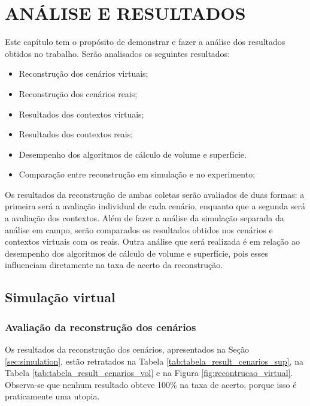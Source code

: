 
\chapter{ANÁLISE E RESULTADOS}
\label{chap:resultados}

Este capítulo tem o propósito de demonstrar e fazer a análise dos resultados obtidos no trabalho.
Serão analisados os seguintes resultados:

\begin{itemize}
    \vspace{0.5em}
    \item Reconstrução dos cenários virtuais;
    \item Reconstrução dos cenários reais;
    \item Resultados dos contextos virtuais;
    \item Resultados dos contextos reais;
    \item Desempenho dos algoritmos de cálculo de volume e superfície.
    \item Comparação entre reconstrução em simulação e no experimento;
\end{itemize}
\vspace{1em}

Os resultados da reconstrução de ambas coletas serão avaliados de duas formas: a primeira será a avaliação individual de cada cenário, enquanto que a segunda será a avaliação dos contextos.
Além de fazer a análise da simulação separada da análise em campo, serão comparados os resultados obtidos nos cenários e contextos virtuais com os reais.
Outra análise que será realizada é em relação ao desempenho dos algoritmos de cálculo de volume e superfície, pois esses influenciam diretamente na taxa de acerto da reconstrução.


\section{Simulação virtual}

\subsection{Avaliação da reconstrução dos cenários}
\label{sec:avaliacao_cenarios}

Os resultados da reconstrução dos cenários, apresentados na Seção \ref{sec:simulation}, estão retratados na Tabela  \ref{tab:tabela_result_cenarios_sup}, na Tabela \ref{tab:tabela_result_cenarios_vol} e na Figura \ref{fig:recontrucao_virtual}.
Observa-se que nenhum resultado obteve 100\% na taxa de acerto, porque isso é praticamente uma utopia.


